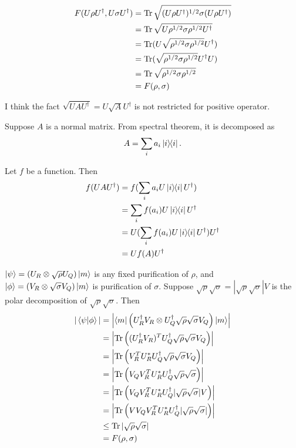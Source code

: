 
\begin{align*}
	F(U \rho U^\dagger, U \sigma U^\dagger) &= \operatorname{Tr} \sqrt{(U\rho U^\dagger)^{1/2} \sigma (U \rho U^\dagger)}\\
		&= \operatorname{Tr} \sqrt{U \rho^{1/2} \sigma \rho^{1/2} U^\dagger}\\
		&= \operatorname{Tr} (U \sqrt{\rho^{1/2} \sigma \rho^{1/2}} U^\dagger)\\
		&= \operatorname{Tr} (\sqrt{\rho^{1/2} \sigma \rho^{1/2}} U^\dagger U)\\
		&= \operatorname{Tr} \sqrt{\rho^{1/2} \sigma \rho^{1/2}}\\
		&= F(\rho, \sigma)
\end{align*}

\begin{screen}
	I think the fact $\sqrt{UAU^\dagger} = U\sqrt{A}U^\dagger$ is not restricted for positive operator.

	Suppose $A$ is a normal matrix. From spectral theorem, it is decomposed as
	\begin{align*}
		A = \sum_i a_i \ket{i}\hspace{-1mm} \bra{i}.
	\end{align*}

	Let $f$ be a function. Then
	\begin{align*}
		f(UAU^\dagger )&= f(\sum_i a_i U \ket{i}\hspace{-1mm} \bra{i} U^\dagger)\\
			&= \sum_i f(a_i) U \ket{i}\hspace{-1mm} \bra{i} U^\dagger\\
			&= U (\sum_i f(a_i) U \ket{i}\hspace{-1mm} \bra{i} U^\dagger) U^\dagger\\
			&= U f(A) U^\dagger
	\end{align*}
\end{screen}


$\ket{\psi} = (U_R \otimes \sqrt{\rho}U_Q) \ket{m}$ is any fixed purification of $\rho$, and $\ket{\phi} = (V_R \otimes \sqrt{\sigma}V_Q) \ket{m}$ is purification of $\sigma$.
Suppose $\sqrt{\rho} \sqrt{\sigma} = |\sqrt{\rho} \sqrt{\sigma}| V$ is the polar decomposition of $\sqrt{\rho} \sqrt{\sigma}$. Then
%
\begin{align*}
    |\braket{\psi | \phi}| &= \left|\braket{m | \left( U_R^\dagger V_R \otimes U_Q^\dagger \sqrt{\rho} \sqrt{\sigma} V_Q \right) | m } \right|\\
        &= \left| \operatorname{Tr} \left((U_R^\dagger V_R)^T U_Q^\dagger \sqrt{\rho} \sqrt{\sigma} V_Q \right)\right|\\
        &= \left| \operatorname{Tr} \left( V_R^T U_R^* U_Q^\dagger \sqrt{\rho} \sqrt{\sigma} V_Q \right)\right|\\
        &= \left| \operatorname{Tr} \left( V_Q V_R^T U_R^* U_Q^\dagger \sqrt{\rho} \sqrt{\sigma} \right)\right|\\
        &= \left| \operatorname{Tr} \left( V_Q V_R^T U_R^* U_Q^\dagger |\sqrt{\rho} \sqrt{\sigma}| V \right)\right|\\
        &= \left| \operatorname{Tr} \left( V V_Q V_R^T U_R^* U_Q^\dagger |\sqrt{\rho} \sqrt{\sigma}| \right)\right|\\
        &\leq \operatorname{Tr} | \sqrt{\rho} \sqrt{\sigma}|\\
        &= F(\rho, \sigma)
\end{align*}

